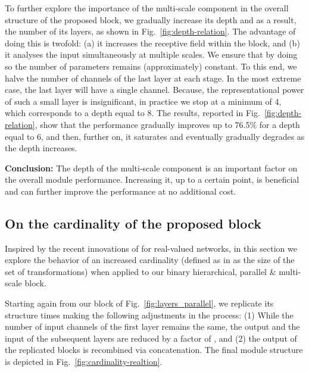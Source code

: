 \documentclass[10pt,journal,compsoc]{IEEEtran}
\begin{document}
To further explore the importance of the multi-scale component in the overall structure of the proposed block, we gradually increase its depth and as a result, the number of its layers, as shown in  Fig.~\ref{fig:depth-relation}. The advantage of doing this is twofold: (a) it increases the receptive field within the block, and (b) it analyses the input simultaneously at multiple scales. We ensure that by doing so the number of parameters remains (approximately) constant. To this end, we halve the number of channels of the last layer at each stage. In the most extreme case, the last layer will have a single channel. Because, the representational power of such a small layer is insignificant, in practice we stop at a minimum of 4, which corresponds to a depth equal to 8. The results, reported in Fig.~\ref{fig:depth-relation}, show that the  performance gradually improves up to 76.5\% for a depth equal to 6, and then, further on, it saturates and eventually gradually degrades as the depth increases. 

\textbf{Conclusion:} The depth of the multi-scale component is an important factor on the overall module performance. Increasing it, up to a certain point, is beneficial and can further improve the performance at no additional cost.



\subsection{On the cardinality of the proposed block}\label{ssec:conv-cardinality}

Inspired by the recent innovations of \cite{xie2016aggregated} for real-valued networks, in this section we explore the behavior of an increased cardinality (defined as in \cite{xie2016aggregated} as the size of the set of transformations) when applied to our binary hierarchical, parallel \& multi-scale block.

Starting again from our block of Fig.~\ref{fig:layers_parallel}, we replicate its structure  times making the following adjustments in the process: (1) While the number of input channels of the first layer remains the same, the output and the input of the subsequent layers are reduced by a factor of , and (2) the output of the replicated blocks is recombined via concatenation. The final module structure is depicted in Fig.~\ref{fig:cardinality-realtion}.
\end{document}
